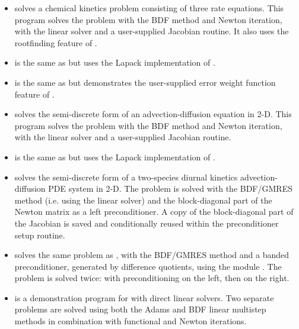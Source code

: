 \begin{itemize}
\item {}
  solves a chemical kinetics problem consisting of three rate equations.
  \newline
  This program solves the problem with the BDF method and Newton          
  iteration, with the {\cvdense} linear solver and a user-supplied    
  Jacobian routine.  It also uses the rootfinding feature of {\cvode}.
\item {}
  is the same as  but uses the Lapack implementation of {\cvdense}.
\item {}
  is the same as  but demonstrates the user-supplied error
  weight function feature of {\cvode}.
\item {}
  solves the semi-discrete form of an advection-diffusion equation in 2-D. 
  \newline
  This program solves the problem with the BDF method and Newton          
  iteration, with the {\cvband} linear solver and a user-supplied     
  Jacobian routine.
\item {}
  is the same as  but uses the Lapack implementation of {\cvband}.
\item {}
  solves the semi-discrete form of a two-species diurnal kinetics
  advection-diffusion PDE system in 2-D.
  \newline
  The problem is solved with the BDF/GMRES method (i.e.    
  using the {\cvspgmr} linear solver) and the block-diagonal part of the  
  Newton matrix as a left preconditioner. A copy of the block-diagonal 
  part of the Jacobian is saved and conditionally reused within the    
  preconditioner setup routine.
\item {}
  solves the same problem as , with the BDF/GMRES method 
  and a banded preconditioner, generated by difference quotients, 
  using the module {\cvbandpre}.
  \newline
  The problem is solved twice: with preconditioning on the left,
  then on the right.
\item {}
  is a demonstration program for {\cvode} with direct linear solvers.
  \newline
  Two separate problems are solved using both the Adams and BDF linear
  multistep methods in combination with functional and Newton
  iterations. 
  \newline

\end{itemize}
